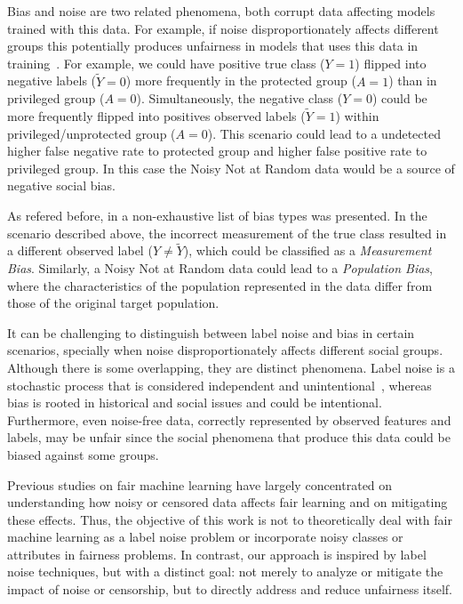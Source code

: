 Bias and noise are two related phenomena, both corrupt data affecting models trained with this data. For example, if noise disproportionately affects different groups this potentially produces unfairness in models that uses this data in training~\citep{Wang2021}. For example, we could have positive true class ($Y = 1$) flipped into negative labels ($\tilde{Y} =0$) more frequently in the protected group ($A = 1$) than in privileged group ($A = 0$). Simultaneously, the negative class ($Y = 0$) could be more frequently flipped into positives observed labels ($\tilde{Y} = 1$) within privileged/unprotected group ($A = 0$). This scenario could lead to a undetected higher false negative rate to protected group and higher false positive rate to privileged group. In this case the Noisy Not at Random data would be a source of negative social bias.

As refered before, in \cite{Mehrabi2019} a non-exhaustive list of bias types was presented. In the scenario described above, the incorrect measurement of the true class resulted in a different observed label ($Y \neq \tilde{Y}$), which could be classified as a \textit{Measurement Bias}. Similarly, a Noisy Not at Random data could lead to a \textit{Population Bias}, where the characteristics of the population represented in the data differ from those of the original target population.

It can be challenging to distinguish between label noise and bias in certain scenarios, specially when noise disproportionately affects different social groups. Although there is some overlapping, they are distinct phenomena. Label noise is a stochastic process that is considered independent and unintentional~\citep{Frenay2014}, whereas bias is rooted in historical and social issues and could be intentional. Furthermore, even noise-free data, correctly represented by observed features and labels, may be unfair since the social phenomena that produce this data could be biased against some groups.

Previous studies on fair machine learning have largely concentrated on understanding how noisy or censored data affects fair learning and on mitigating these effects. Thus, the objective of this work is not to theoretically deal with fair machine learning as a label noise problem or incorporate noisy classes or attributes in fairness problems. In contrast, our approach is inspired by label noise techniques, but with a distinct goal: not merely to analyze or mitigate the impact of noise or censorship, but to directly address and reduce unfairness itself.

